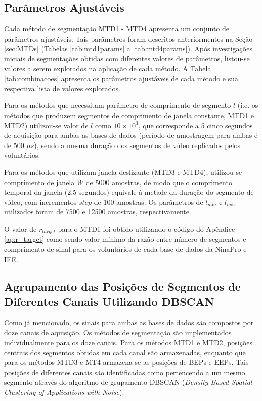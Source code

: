 				\subsection{Parâmetros Ajustáveis}
Cada método de segmentação MTD1 - MTD4 apresenta um conjunto de parâmetros ajustáveis. Tais parâmetros foram descritos anteriormentes na Seção \ref{sec:MTDs} (Tabelas \ref{tab:mtd1params} a \ref{tab:mtd4params}). Após investigações iniciais de segmentações obtidas com diferentes valores de parâmetros, listou-se valores a serem explorados na aplicação de cada método. A Tabela \ref{tab:combinacoes} apresenta os parâmetros ajustáveis de cada método e sua respectiva lista de valores explorados.



Para os métodos que necessitam parâmetro de comprimento de segmento $l$ (i.e. os métodos que produzem segmentos de comprimento de janela constante, MTD1 e MTD2) utilizou-se valor de $l$ como $10 \times 10^3$, que corresponde a 5 cinco segundos de aquisição para ambas as bases de dados (período de amostragem para ambas é de 500 $\mu s$), sendo a mesma duração dos segmentos de vídeo replicados pelos voluntários.

Para os métodos que utilizam janela deslizante (MTD3 e MTD4), utilizou-se comprimento de janela $W$ de 5000 amostras, de modo que o comprimento temporal da janela (2,5 segundos) equivale à metade da duração do segmento de vídeo, com incrementos $step$ de 100 amostras. Os parâmetros de $l_{mín}$ e $l_{máx}$ utilizados foram de 7500 e 12500 amostras, respectivamente.

O valor de $r_{target}$  para o MTD1 foi obtido utilizando o código do Apêndice \ref{ap:r_target} como sendo valor mínimo da razão entre número de segmentos e comprimento de sinal para os voluntários de cada base de dados da NinaPro e IEE.

			\subsection{Agrupamento das Posições de Segmentos de Diferentes Canais Utilizando DBSCAN}
Como já mencionado, os sinais para ambas as bases de dados são compostos por doze canais de aquisição. Os métodos de segmentação são implementados individualmente para os doze canais. Para os métodos MTD1 e MTD2, posições centrais dos segmentos obtidas em cada canal são armazenadas, enquanto que para os métodos MTD3 e MT4 armazena-se as posições de BEPs e EEPs. Tais posições de diferentes canais são identificadas como pertencendo a um mesmo segmento através do algoritmo de grupamento DBSCAN (\emph{Density-Based Spatial Clustering of Applications with Noise}).

